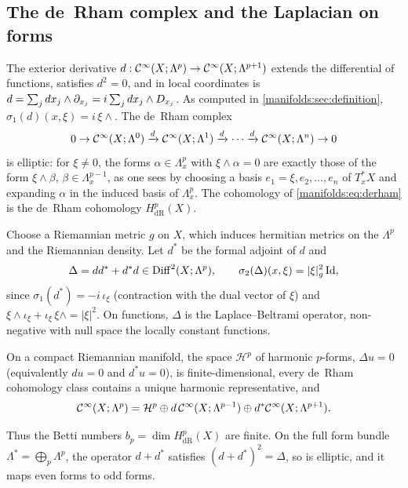 \subsection{The de~Rham complex and the Laplacian on forms}
The exterior derivative $d:\mathcal{C}^\infty(X;\Lambda^p)\to\mathcal{C}^\infty(X;\Lambda^{p+1})$ extends the
differential of functions, satisfies $d^2=0$, and in local coordinates is
$d=\sum_jdx_j\wedge\partial_{x_j}=i\sum_jdx_j\wedge D_{x_j}$. As computed in
\cref{manifolds:sec:definition}, $\sigma_1(d)(x,\xi)=i\,\xi\wedge$. The de~Rham complex
\begin{equation}\label{manifolds:eq:derham}
0\to\mathcal{C}^\infty(X;\Lambda^0)\xrightarrow d\mathcal{C}^\infty(X;\Lambda^1)\xrightarrow d\cdots\xrightarrow d\mathcal{C}^\infty(X;\Lambda^n)\to0
\end{equation}
is elliptic: for $\xi\ne0$, the forms $\alpha\in\Lambda^p_x$ with $\xi\wedge\alpha=0$ are exactly
those of the form $\xi\wedge\beta$, $\beta\in\Lambda^{p-1}_x$, as one sees by choosing a basis
$e_1=\xi,e_2,\dots,e_n$ of $T^*_xX$ and expanding $\alpha$ in the induced basis of
$\Lambda^p_x$. The cohomology of \eqref{manifolds:eq:derham} is the de~Rham cohomology
$H^p_{\mathrm{dR}}(X)$.

Choose a Riemannian metric $g$ on $X$, which induces hermitian metrics on the
$\Lambda^p$ and the Riemannian density. Let $d^*$ be the formal adjoint of $d$ and
\begin{equation*}
\Delta=dd^*+d^*d\in\operatorname{Diff}^{2}(X;\Lambda^p),\qquad\sigma_2(\Delta)(x,\xi)=|\xi|_g^2\operatorname{Id},
\end{equation*}
since $\sigma_1(d^*)=-i\,\iota_\xi$ (contraction with the dual vector of $\xi$) and
$\xi\wedge\iota_\xi+\iota_\xi\,\xi\wedge=|\xi|^2$. On functions, $\Delta$ is the
Laplace--Beltrami operator, non-negative with null space the locally constant
functions.

\begin{corollary}\label{manifolds:cor:hodge-derham}
On a compact Riemannian manifold, the space $\mathcal H^p$ of harmonic $p$-forms,
$\Delta u=0$ (equivalently $du=0$ and $d^*u=0$), is finite-dimensional, every de~Rham
cohomology class contains a unique harmonic representative, and
\begin{equation*}
\mathcal{C}^\infty(X;\Lambda^p)=\mathcal H^p\oplus d\,\mathcal{C}^\infty(X;\Lambda^{p-1})\oplus d^*\mathcal{C}^\infty(X;\Lambda^{p+1}).
\end{equation*}
\end{corollary}

Thus the Betti numbers $b_p=\dim H^p_{\mathrm{dR}}(X)$ are finite. On the full form
bundle $\Lambda^*=\bigoplus_p\Lambda^p$, the operator $d+d^*$ satisfies
$(d+d^*)^2=\Delta$, so is elliptic, and it maps even forms to odd forms.

